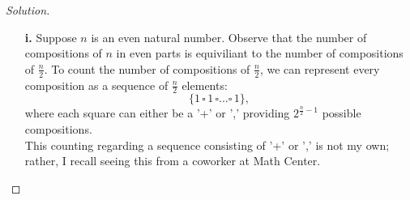 \documentclass[ 12pt ]{article}
\begin{document}
\begin{enumerate}
		\begin{proof}[Solution]
			\begin{enumerate}
				\item[\textbf{i.}] Suppose $n$ is an even natural number. Observe that the number of compositions of $n$ in even parts is equiviliant to the number of compositions
					of $\frac{n}{2}$. To count the number of compositions of $\frac{n}{2}$, we can represent every composition as a sequence of $\frac{n}{2}$ elements:
					$$\{ 1\, \square\, 1\, \square \hdots \square\, 1 \},$$ where each square can either be a '+' or ',' providing $2^{\frac{n}{2} - 1}$ possible compositions. \\
					This counting regarding a sequence consisting of '+' or ',' is not my own; rather, I recall seeing this from a coworker at Math Center.
			\end{enumerate}
		\end{proof}
\end{enumerate}
\end{document}
